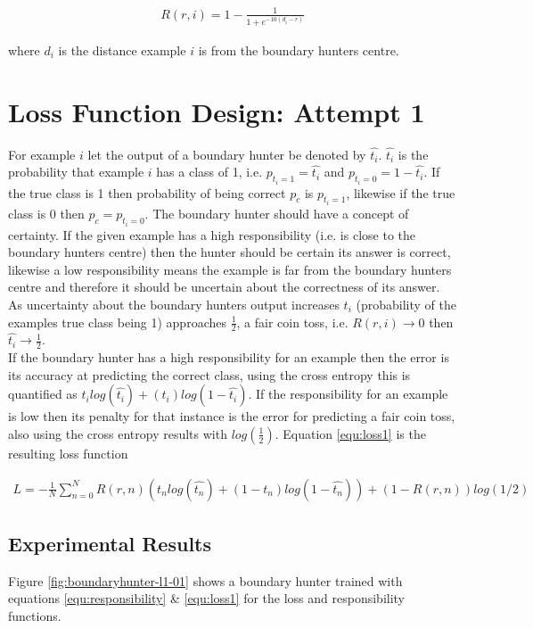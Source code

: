 \documentclass[notitlepage]{report}
\theoremstyle{definition}
\begin{document}
\begin{align}
R(r, i) = 1 - \frac{1}{1 + e^{-10(d_i-r)}}
\label{equ:responsibility}
\end{align}

where $d_i$ is the distance example $i$ is from the boundary hunters centre.

\section{Loss Function Design: Attempt 1}
\label{sec:lossfunction-a1}
For example $i$ let the output of a boundary hunter be denoted by $\widehat{t_i}$. $\widehat{t_i}$ is the probability that example $i$ has a class of 1, i.e. $p_{t_i=1} = \widehat{t_i}$ and $p_{t_i=0} = 1 - \widehat{t_i}$. If the true class is 1 then probability of being correct $p_c$ is $p_{t_i=1}$, likewise if the true class is 0 then $p_c = p_{t_i=0}$. The boundary hunter should have a concept of certainty. If the given example has a high responsibility (i.e. is close to the boundary hunters centre) then the hunter should be certain its answer is correct, likewise a low responsibility means the example is far from the boundary hunters centre and therefore it should be uncertain about the correctness of its answer.\\

As uncertainty about the boundary hunters output increases $t_i$ (probability of the examples true class being 1) approaches $\frac{1}{2}$, a fair coin toss, i.e. $R(r, i) \rightarrow 0$ then $\widehat{t_i} \rightarrow \frac{1}{2}$.\\

If the boundary hunter has a high responsibility for an example then the error is its accuracy at predicting the correct class, using the cross entropy this is quantified as $t_i log(\widehat{t_i}) + (t_i)log(1 - \widehat{t_i})$. If the responsibility for an example is low then its penalty for that instance is the error for predicting a fair coin toss, also using the cross entropy results with $log(\frac{1}{2})$. Equation \ref{equ:loss1} is the resulting loss function

\begin{align}
L = -\frac{1}{N} \sum_{n=0}^N R(r, n) (t_n log(\widehat{t_n}) + (1-t_n)log(1 - \widehat{t_n})) + (1-R(r, n)) log(1/2)
\label{equ:loss1}
\end{align}

\subsection{Experimental Results}
Figure \ref{fig:boundaryhunter-l1-01} shows a boundary hunter trained with equations \ref{equ:responsibility} \& \ref{equ:loss1} for the loss and responsibility functions.
\end{document}
